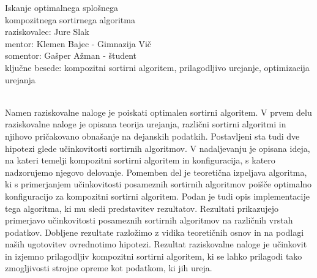 \documentclass[a4paper,oneside,12pt]{article}
\begin{document}
\begin{center}
  {\huge Iskanje optimalnega splošnega \\ kompozitnega sortirnega algoritma} \\[10mm]
 raziskovalec: Jure Slak \\[5mm]
 mentor: Klemen Bajec - Gimnazija Vič \\[3mm]
 somentor: Gašper Ažman - študent  \\[5mm]
 ključne besede: kompozitni sortirni algoritem, prilagodljivo urejanje, optimizacija urejanja \\[10mm]
\end{center} 

{ \\[4mm]}
Namen raziskovalne naloge je poiskati optimalen sortirni algoritem.
V prvem delu raziskovalne naloge je opisana teorija urejanja, različni sortirni
algoritmi in njihovo pričakovano obnašanje na dejanskih podatkih. Postavljeni sta tudi dve 
hipotezi glede učinkovitosti sortirnih algoritmov. 
V nadaljevanju je opisana ideja, na
kateri temelji kompozitni sortirni algoritem in konfiguracija, s katero nadzorujemo
njegovo delovanje. Pomemben del je teoretična izpeljava
algoritma, ki s primerjanjem učinkovitosti posameznih sortirnih algoritmov poišče
optimalno konfiguracijo za kompozitni sortirni algoritem. Podan je tudi opis 
implementacije tega algoritma, ki mu sledi 
predstavitev rezultatov. Rezultati prikazujejo primerjavo učinkovitosti posameznih 
sortirnih algoritmov na različnih vrstah podatkov. 
Dobljene rezultate razložimo z vidika teoretičnih osnov in na podlagi naših ugotovitev 
ovrednotimo hipotezi. Rezultat raziskovalne naloge je učinkovit in izjemno prilagodljiv
kompozitni sortirni algoritem, ki se lahko prilagodi tako zmogljivosti strojne opreme
kot podatkom, ki jih ureja.
\end{document}
